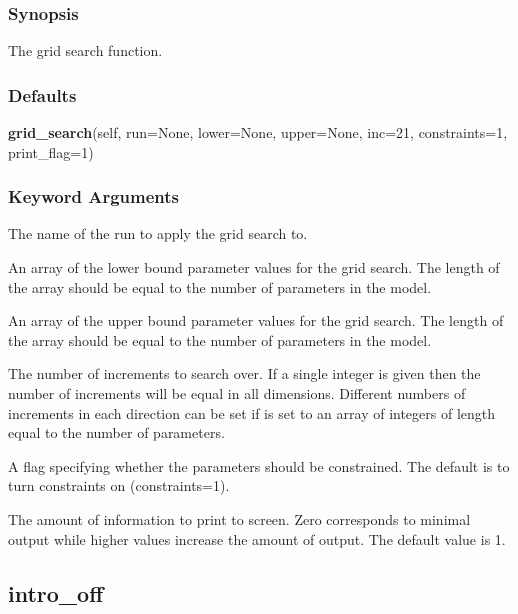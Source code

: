   
 \subsubsection{Synopsis} 

 The grid search function. 
  

  
 \subsubsection{Defaults} 

 \textsf{\textbf{grid\_search}(self, run=None, lower=None, upper=None, inc=21, constraints=1, print\_flag=1)} 

  
 \subsubsection{Keyword Arguments} 

   The name of the run to apply the grid search to.   

   An array of the lower bound parameter values for the grid search.  The length of the array should be equal to the number of parameters in the model.   

   An array of the upper bound parameter values for the grid search.  The length of the array should be equal to the number of parameters in the model.   

   The number of increments to search over.  If a single integer is given then the number of increments will be equal in all dimensions.  Different numbers of increments in each direction can be set if  is set to an array of integers of length equal to the number of parameters.   

   A flag specifying whether the parameters should be constrained.  The default is to turn constraints on (constraints=1).   

   The amount of information to print to screen.  Zero corresponds to minimal output while higher values increase the amount of output.  The default value is 1.  

  

  

 \newpage 

 \subsection{intro\_off} 

